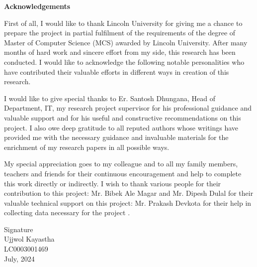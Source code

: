 \pagestyle{plain}
\vspace*{52pt}
\begin{center}
    \large{\textbf{Acknowledgements}}\\[31pt]
\end{center}
First of all, I would like to thank Lincoln University for giving me a chance to prepare the project in partial fulfilment of the requirements of the degree of Master of Computer Science (MCS) awarded by Lincoln University. 
After many months of hard work and sincere effort from my side, this research has been conducted. I would like to acknowledge the following notable personalities who have contributed their valuable efforts in different ways in creation of this research.

 \par \noindent I would like to give special thanks to Er. Santosh Dhungana, Head of Department, IT, my research project supervisor for his professional guidance and valuable support and for his useful and constructive recommendations on this project.
I also owe deep gratitude to all reputed authors whose writings have provided me with the necessary guidance and invaluable materials for the enrichment of my research papers in all possible ways. 

\par \noindent My special appreciation goes to my colleague and to all my family members, teachers and friends for their continuous encouragement and help to complete this work directly or indirectly.
I wish to thank various people for their contribution to this project: Mr. Bibek Ale Magar and Mr. Dipesh Dulal for their valuable technical support on this project: Mr. Prakash Devkota for their help in collecting data necessary for the project .


\vspace{73pt}

\begin{flushleft}
    Signature \\
    Ujjwol Kayastha\\
    LC0003001469\\
    July, 2024
\end{flushleft}

